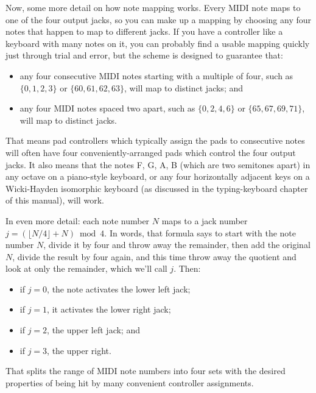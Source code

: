 Now, some more detail on how note mapping works.  Every MIDI note maps to one
of the four output jacks, so you can make up a mapping by choosing any four
notes that happen to map to different jacks.  If you have a controller like
a keyboard with many notes on it, you can probably find a usable mapping
quickly just through trial and error, but the scheme is designed to
guarantee that:
\begin{itemize}
\item any four consecutive MIDI notes starting with a multiple of four, such
as $\{0,1,2,3\}$ or $\{60,61,62,63\}$, will map to distinct jacks; and
\item any four MIDI notes spaced two apart, such as $\{0,2,4,6\}$ or
$\{65,67,69,71\}$, will map to distinct jacks.
\end{itemize}

That means pad controllers which typically assign the pads to consecutive
notes will often have four conveniently-arranged pads which control the four
output jacks.  It also means that the notes F, G, A, B (which are two
semitones apart) in any octave on a piano-style keyboard, or any four
horizontally adjacent keys on a Wicki-Hayden isomorphic keyboard (as
discussed in the typing-keyboard chapter of this manual), will work.

In even more detail:  each note number $N$ maps to a jack number $j=(\lfloor
N/4 \rfloor+N) \bmod 4$.  In words, that formula says to start with the note
number $N$, divide it by four and throw away the remainder, then add the
original $N$, divide the result by four again, and this time throw away the
quotient and look at only the remainder, which we'll call $j$.  Then:
\begin{itemize}
\item if $j=0$, the note activates the lower left jack;
\item if $j=1$, it activates the lower right jack;
\item if $j=2$, the upper left jack; and
\item if $j=3$, the upper right.
\end{itemize}

That splits the range of MIDI note numbers into four sets with the desired
properties of being hit by many convenient controller assignments.


